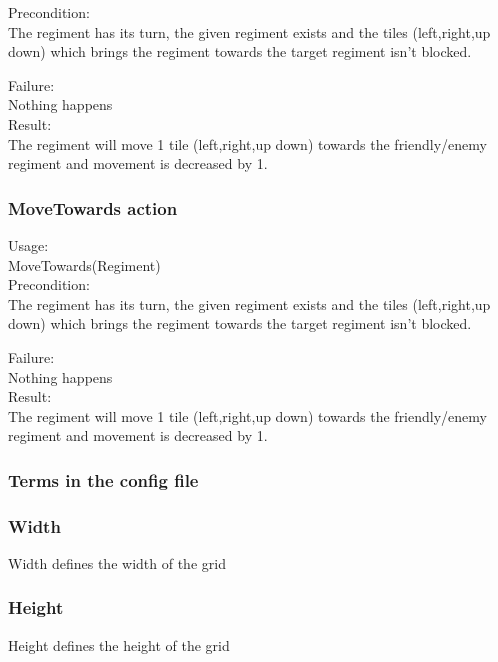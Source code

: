 		Precondition: \\
		The regiment has its turn, the given regiment exists and the tiles (left,right,up down) 
		which brings the regiment towards the target regiment isn't blocked.
		
		Failure: \\
		Nothing happens \\
		
		Result: \\
		The regiment will move 1 tile (left,right,up down) towards the friendly/enemy regiment and movement is decreased by 1.
		
		\subsubsection{MoveTowards action}
		Usage: \\
		MoveTowards(Regiment) \\
		
		Precondition: \\
		The regiment has its turn, the given regiment exists and the tiles (left,right,up down) 
		which brings the regiment towards the target regiment isn't blocked.
		
		Failure: \\
		Nothing happens \\
		
		Result: \\
		The regiment will move 1 tile (left,right,up down) towards the friendly/enemy regiment and movement is decreased by 1.
				
		\subsubsection{Terms in the config file}
		
		\subsubsection{Width}
		Width defines the width of the grid
		
		\subsubsection{Height}
		Height defines the height of the grid
		
